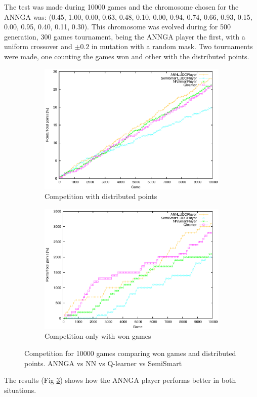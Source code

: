 		The test was made during 10000 games and the chromosome chosen for the ANNGA was: (0.45, 1.00, 0.00, 0.63, 0.48, 0.10, 0.00, 0.94, 0.74, 0.66, 0.93, 0.15, 0.00, 0.95, 0.40, 0.11, 0.30).
		This chromosome was evolved during for 500 generation, 300 games tournament, being the ANNGA player the first, with a uniform crossover and $\pm 0.2$ in mutation with a random mask.
		Two tournaments were made, one counting the games won and other with the distributed points.
			\begin{figure}[!ht]
				\centering
				\begin{subfigure}{.5\textwidth}
				  \centering
				  \includegraphics[width=\textwidth]{figures/competition_points}
				  \caption{Competition with distributed points}
				  \label{fig:competition_points}
				\end{subfigure}%
				\begin{subfigure}{.5\textwidth}
				  \centering
				  \includegraphics[width=\textwidth]{figures/competition_won}
				  \caption{Competition only with won games}
				  \label{fig:competition_won}
				\end{subfigure}
				\caption{Competition for 10000 games comparing won games and distributed points. ANNGA vs NN vs Q-learner vs SemiSmart}
				\label{fig:competition}
			\end{figure}

		The results (Fig \ref{fig:competition}) shows how the ANNGA player performs better in both situations.



